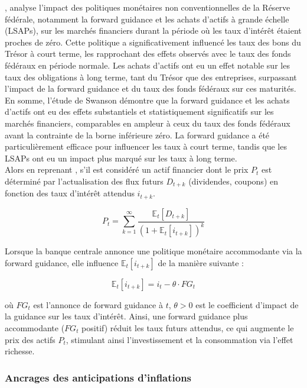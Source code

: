 \citep{swanson2021}, analyse l'impact des politiques monétaires non conventionnelles de la Réserve fédérale, notamment la forward guidance et les achats d'actifs à grande échelle (LSAPs), sur les marchés financiers durant la période où les taux d'intérêt étaient proches de zéro. Cette politique a significativement influencé les taux des bons du Trésor à court terme, les rapprochant des effets observés avec le taux des fonds fédéraux en période normale. Les achats d'actifs ont eu un effet notable sur les taux des obligations à long terme, tant du Trésor que des entreprises, surpassant l'impact de la forward guidance et du taux des fonds fédéraux sur ces maturités. En somme, l'étude de Swanson démontre que la forward guidance et les achats d'actifs ont eu des effets substantiels et statistiquement significatifs sur les marchés financiers, comparables en ampleur à ceux du taux des fonds fédéraux avant la contrainte de la borne inférieure zéro. La forward guidance a été particulièrement efficace pour influencer les taux à court terme, tandis que les LSAPs ont eu un impact plus marqué sur les taux à long terme.\\

Alors en reprenant \citep{swanson2021}, s'il est considéré un actif financier dont le prix \( P_t \) est déterminé par l’actualisation des flux futurs \( D_{t+k} \) (dividendes, coupons) en fonction des taux d’intérêt attendus \( i_{t+k} \).

\begin{equation} 
P_t = \sum_{k=1}^{\infty} \frac{\mathbb{E}_t [D_{t+k}]}{(1 + \mathbb{E}_t [i_{t+k}])^k} 
\end{equation}

Lorsque la banque centrale annonce une politique monétaire accommodante via la forward guidance, elle influence \( \mathbb{E}_t [i_{t+k}] \) de la manière suivante :

\begin{equation}
\mathbb{E}_t [i_{t+k}] = i_t - \theta \cdot FG_t
\end{equation}

où \( FG_t \) est l’annonce de forward guidance à \( t \), \( \theta > 0 \) est le coefficient d’impact de la guidance sur les taux d’intérêt. Ainsi, une forward guidance plus accommodante (\( FG_t \) positif) réduit les taux futurs attendus, ce qui augmente le prix des actifs \( P_t \), stimulant ainsi l’investissement et la consommation via l’effet richesse.

\subsubsection{Ancrages des anticipations d'inflations}

